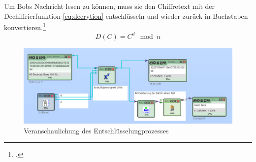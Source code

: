 \documentclass{scrarticle} %
\begin{document}
            Um Bobs Nachricht lesen zu können, muss sie den Chiffretext mit der Dechiffrierfunktion \ref{eq:decrytion} entschlüsseln und wieder zurück in Buchstaben konvertieren.\footcite[77]{ertel2003}
            \begin{equation}
                D(C) = C^{d}\mod{n} \label{eq:decrytion}
            \end{equation}
            \begin{figure}
                \includegraphics[width=\linewidth]{content/cryptool_decrypt_e1.png}
                \caption{Veranschaulichung des Entschlüsselungprozesses}
                \label{fig:decrypt}
            \end{figure}

\end{document}
